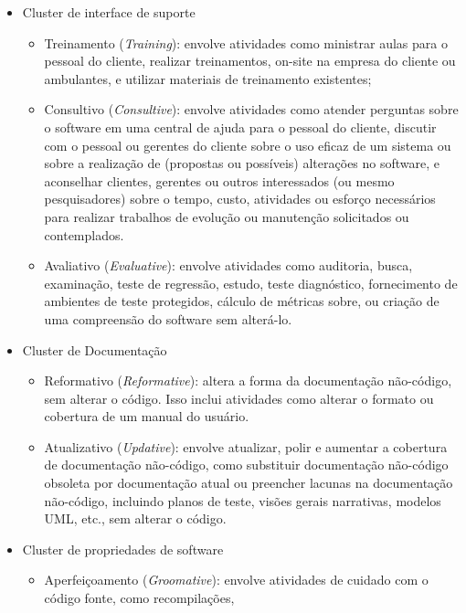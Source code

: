 \begin{itemize}
    \item Cluster de interface de suporte
    \begin{itemize}
        \item Treinamento (\textit{Training}): envolve atividades como ministrar aulas para o pessoal do cliente, 
        realizar treinamentos, on-site na empresa do cliente ou ambulantes, e utilizar materiais de 
        treinamento existentes;
        \item Consultivo (\textit{Consultive}): envolve atividades como atender perguntas sobre o software em uma central 
        de ajuda para o pessoal do cliente, discutir com o pessoal ou gerentes do cliente sobre o uso 
        eficaz de um sistema ou sobre a realização de (propostas ou possíveis) alterações no software, 
        e aconselhar clientes, gerentes ou outros interessados (ou mesmo pesquisadores) sobre o tempo, 
        custo, atividades ou esforço necessários para realizar trabalhos de evolução ou manutenção 
        solicitados ou contemplados.
        \item Avaliativo (\textit{Evaluative}): envolve atividades como auditoria, busca, examinação, teste de regressão, 
        estudo, teste diagnóstico, fornecimento de ambientes de teste protegidos, cálculo de métricas 
        sobre, ou criação de uma compreensão do software sem alterá-lo.
    \end{itemize}
    \item Cluster de Documentação
    \begin{itemize}
        \item Reformativo (\textit{Reformative}): altera a forma da documentação não-código, sem alterar o código. Isso inclui 
        atividades como alterar o formato ou cobertura de um manual do usuário.
        \item Atualizativo (\textit{Updative}): envolve atualizar, polir e aumentar a cobertura de documentação não-código, 
        como substituir documentação não-código obsoleta por documentação atual ou preencher lacunas na 
        documentação não-código, incluindo planos de teste, visões gerais narrativas, modelos UML, etc., 
        sem alterar o código.
    \end{itemize}
    \item Cluster de propriedades de software
    \begin{itemize}
        \item Aperfeiçoamento (\textit{Groomative}): envolve atividades de cuidado com o código fonte, como recompilações, 

\end{itemize}
\end{itemize}
